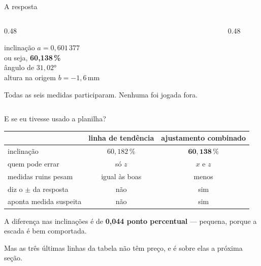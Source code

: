 \documentclass[aspectratio=169,11pt]{beamer}
\newcommand{\bnum}[1]{\textbf{\textcolor{mTeal}{#1}}}
\begin{document}
\begin{frame}{A resposta}
  \begin{columns}[c]
    \begin{column}{0.48\textwidth}
      \begin{ideia}[title={O corrimão medido}]
        inclinação \bnum{$a = 0{,}601\,377$}\\[3pt]
        ou seja, \bnum{60{,}138\,\%}\\[3pt]
        ângulo de \bnum{$31{,}02°$}\\[3pt]
        altura na origem $b = -1{,}6$\,mm
      \end{ideia}
      \medskip

      Todas as seis medidas participaram. Nenhuma foi jogada fora.
    \end{column}
    \begin{column}{0.48\textwidth}
      \centering
    \end{column}
  \end{columns}
\end{frame}

\begin{frame}{E se eu tivesse usado a planilha?}
  \centering
  \small
  \renewcommand{\arraystretch}{1.3}
  \begin{tabular}{lcc}
    \toprule
    & linha de tendência & \textcolor{mTeal}{\textbf{ajustamento combinado}} \\
    \midrule
    inclinação & $60{,}182\,\%$ & \textcolor{mTeal}{$\mathbf{60{,}138\,\%}$} \\
    quem pode errar & só $z$ & \textcolor{mTeal}{$x$ e $z$} \\
    medidas ruins pesam & igual às boas & \textcolor{mTeal}{menos} \\
    diz o $\pm$ da resposta & \textcolor{mRose}{não} & \textcolor{mTeal}{sim} \\
    aponta medida suspeita & \textcolor{mRose}{não} & \textcolor{mTeal}{sim} \\
    \bottomrule
  \end{tabular}
  \bigskip

  A diferença nas inclinações é de \bnum{0,044 ponto percentual} --- pequena, porque a
  escada é bem comportada.
  \medskip

  \alert{Mas as três últimas linhas da tabela não têm preço}, e é sobre elas a próxima seção.
\end{frame}
\end{document}
